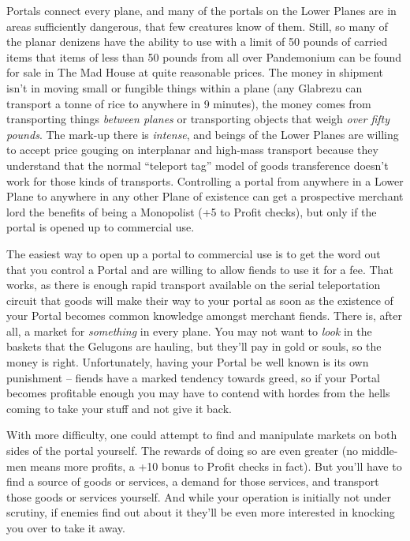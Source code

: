 Portals connect every plane, and many of the portals on the Lower Planes are in areas sufficiently dangerous, that few creatures know of them. Still, so many of the planar denizens have the ability to use  with a limit of 50 pounds of carried items that items of less than 50 pounds from all over Pandemonium can be found for sale in The Mad House at quite reasonable prices. The money in shipment isn't in moving small or fungible things within a plane (any Glabrezu can transport a tonne of rice to anywhere in 9 minutes), the money comes from transporting things \textit{between planes} or transporting objects that weigh \textit{over fifty pounds}. The mark-up there is \textit{intense}, and beings of the Lower Planes are willing to accept price gouging on interplanar and high-mass transport because they understand that the normal ``teleport tag'' model of goods transference doesn't work for those kinds of transports. Controlling a portal from anywhere in a Lower Plane to anywhere in any other Plane of existence can get a prospective merchant lord the benefits of being a Monopolist (+5 to Profit checks), but only if the portal is opened up to commercial use.

The easiest way to open up a portal to commercial use is to get the word out that you control a Portal and are willing to allow fiends to use it for a fee. That works, as there is enough rapid transport available on the serial teleportation circuit that goods will make their way to your portal as soon as the existence of your Portal becomes common knowledge amongst merchant fiends. There is, after all, a market for \textit{something} in every plane. You may not want to \textit{look} in the baskets that the Gelugons are hauling, but they'll pay in gold or souls, so the money is right. Unfortunately, having your Portal be well known is its own punishment -- fiends have a marked tendency towards greed, so if your Portal becomes profitable enough you may have to contend with hordes from the hells coming to take your stuff and not give it back.

With more difficulty, one could attempt to find and manipulate markets on both sides of the portal yourself. The rewards of doing so are even greater (no middle-men means more profits, a +10 bonus to Profit checks in fact). But you'll have to find a source of goods or services, a demand for those services, and transport those goods or services yourself. And while your operation is initially not under scrutiny, if enemies find out about it they'll be even more interested in knocking you over to take it away.

